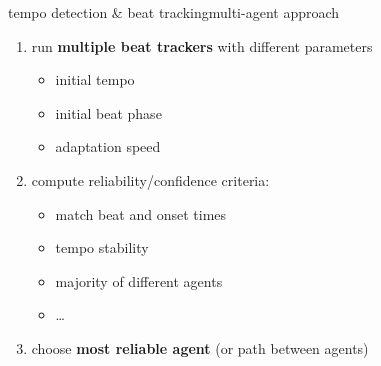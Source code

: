         \begin{frame}{tempo detection \& beat tracking}{multi-agent approach}
            \begin{enumerate}
                \item	run \textbf{multiple beat trackers} with different parameters
                    \begin{itemize}
                        \item	initial tempo
                        \item	initial beat phase
                        \item	adaptation speed
                    \end{itemize}
                \item<2->	compute reliability/confidence criteria:
                
                    \begin{itemize}
                        \item	match beat and onset times
                        \item<3->	tempo stability
                        \item<4->	majority of different agents
                        \item   \ldots
                    \end{itemize}
                \item<5->	choose\textbf{ most reliable agent} (or path between agents)
            \end{enumerate}
        \end{frame}
        
